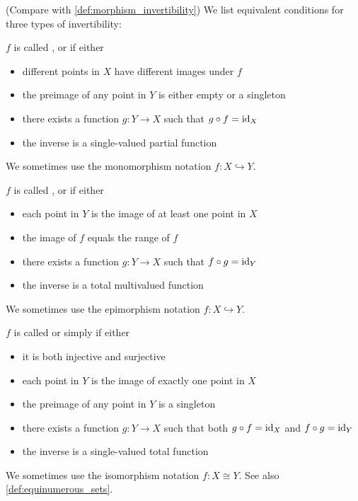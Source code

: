 \begin{definition}\label{def:function_invertibility}(Compare with \cref{def:morphism_invertibility})
  We list equivalent conditions for three types of invertibility:
  \begin{defenum}
    \item\label{def:function_invertibility/injection} $f$ is called ,  or  if either
    \begin{itemize}
      \item different points in $X$ have different images under $f$
      \item the preimage of any point in $Y$ is either empty or a singleton
      \item there exists a function $g: Y \to X$ such that $g \circ f = \operatorname{id}_X$
      \item the inverse is a single-valued partial function
    \end{itemize}

    We sometimes use the monomorphism notation $f: X \hookrightarrow Y$.

    \item\label{def:function_invertibility/surjection} $f$ is called ,  or  if either
    \begin{itemize}
      \item each point in $Y$ is the image of at least one point in $X$
      \item the image of $f$ equals the range of $f$
      \item there exists a function $g: Y \to X$ such that $f \circ g = \operatorname{id}_Y$
      \item the inverse is a total multivalued function
    \end{itemize}

    We sometimes use the epimorphism notation $f: X \hookrightarrow Y$.

    \item\label{def:function_invertibility/bijection} $f$ is called  or simply  if either
    \begin{itemize}
      \item it is both injective and surjective
      \item each point in $Y$ is the image of exactly one point in $X$
      \item the preimage of any point in $Y$ is a singleton
      \item there exists a function $g: Y \to X$ such that both $g \circ f = \operatorname{id}_X$ and $f \circ g = \operatorname{id}_Y$
      \item the inverse is a single-valued total function
    \end{itemize}

    We sometimes use the isomorphism notation $f: X \cong Y$. See also \cref{def:equinumerous_sets}.
  \end{defenum}
\end{definition}

